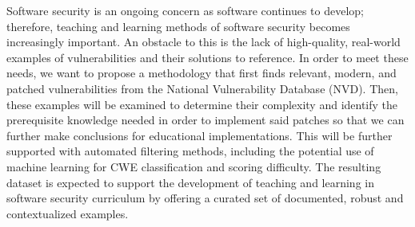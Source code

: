 \done{}

\done{}
Software security is an ongoing concern as software continues to develop; therefore, teaching and learning methods of software security becomes increasingly important. An obstacle to this is the lack of high-quality, real-world examples of vulnerabilities and their solutions to reference. In order to meet these needs, we want to propose a methodology that first finds relevant, modern, and patched vulnerabilities from the National Vulnerability Database (NVD). Then, these examples will be examined to determine their complexity and identify the prerequisite knowledge needed in order to implement said patches so that we can further make conclusions for educational implementations. This will be further supported with automated filtering methods, including the potential use of machine learning for CWE classification and scoring difficulty. The resulting dataset is expected to support the development of teaching and learning in software security curriculum by offering a curated set of documented, robust and contextualized examples.